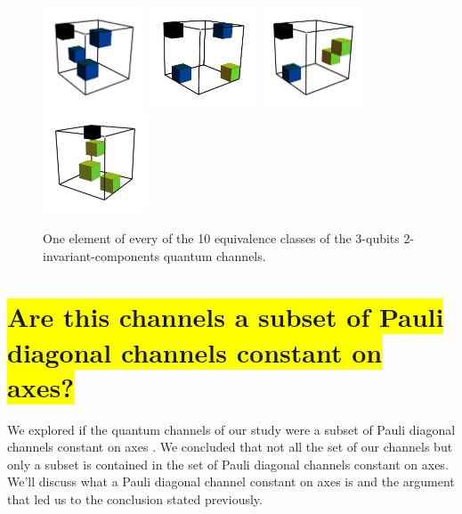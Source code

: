 \documentclass[11pt,dvipsnames]{article} %
\newcommand{\h}[1]{\colorbox{Yellow}{#1}}
\newcommand{\1}{\mathds{1}}
\begin{document}
\begin{figure}[H]
	\hfill
	\includegraphics[height=3cm]{img/3q-4c-no-2}
	\hfill
	\includegraphics[height=3cm]{img/3q-4c-no-3}
	\hfill
	\includegraphics[height=3cm]{img/3q-4c-no-4}
	\hfill
	\includegraphics[height=3cm]{img/3q-4c-no-5}
	\hfill \hfill
	\caption{One element of every of the 10 equivalence
	classes of the 3-qubits 2-invariant-components quantum channels.}
	\label{fig:QC-3q-4c}
\end{figure}

\section*{\h{Are this channels a subset of Pauli diagonal channels constant
on axes?}}

We explored if the quantum channels of our study were a subset 
of Pauli diagonal channels constant on axes \cite{nathanson2007pauli}.
We concluded that not all the set of our channels but only a subset
is contained in the set of Pauli diagonal channels constant on axes.
We'll discuss what a Pauli diagonal channel constant on axes is and 
the argument that led us to the conclusion stated previously.
\end{document}
